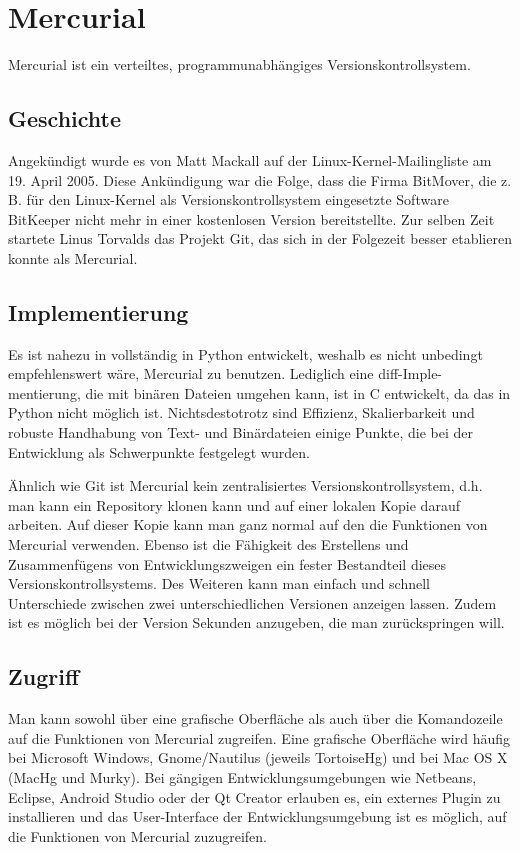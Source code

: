 \section{Mercurial}
Mercurial ist ein verteiltes, programmunabhängiges Versionskontrollsystem.
\subsection{Geschichte}
Angekündigt wurde es von Matt Mackall auf der Linux-Kernel-Mailingliste am 19. April 2005. Diese Ankündigung war die Folge, dass die Firma BitMover, die z. B. für den Linux-Kernel als Versionskontrollsystem eingesetzte Software BitKeeper nicht mehr in einer kostenlosen Version bereitstellte. Zur selben Zeit startete Linus Torvalds das Projekt Git, das sich in der Folgezeit besser etablieren konnte als Mercurial.
\subsection{Implementierung}
Es ist nahezu in vollständig in Python entwickelt, weshalb es nicht unbedingt empfehlenswert wäre, Mercurial zu benutzen. Lediglich eine diff-Imple-mentierung, die mit binären Dateien umgehen kann, ist in C entwickelt, da das in Python nicht möglich ist. Nichtsdestotrotz sind Effizienz, Skalierbarkeit und robuste Handhabung von Text- und Binärdateien einige Punkte, die bei der Entwicklung als Schwerpunkte festgelegt wurden.

Ähnlich wie Git ist Mercurial kein zentralisiertes Versionskontrollsystem, d.h. man kann ein Repository klonen kann und auf einer lokalen Kopie darauf arbeiten. Auf dieser Kopie kann man ganz normal auf den die Funktionen von Mercurial verwenden. Ebenso ist die Fähigkeit des Erstellens und Zusammenfügens von Entwicklungszweigen ein fester Bestandteil dieses Versionskontrollsystems. Des Weiteren kann man einfach und schnell Unterschiede zwischen zwei unterschiedlichen Versionen anzeigen lassen. Zudem ist es möglich bei der Version Sekunden anzugeben, die man zurückspringen will.
\subsection{Zugriff}
Man kann sowohl über eine grafische Oberfläche als auch über die Komandozeile auf die Funktionen von Mercurial zugreifen. Eine grafische Oberfläche wird häufig bei Microsoft Windows, Gnome/Nautilus (jeweils TortoiseHg) und bei Mac OS X (MacHg und Murky). Bei gängigen Entwicklungsumgebungen wie Netbeans, Eclipse, Android Studio oder der Qt Creator erlauben es, ein externes Plugin zu installieren und das User-Interface der Entwicklungsumgebung ist es möglich, auf die Funktionen von Mercurial zuzugreifen.
